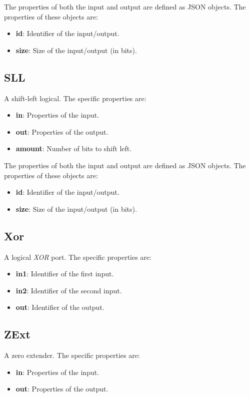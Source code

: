 \documentclass[11pt,a4paper,twoside,titlepage]{report}
\begin{document}
The properties of both the input and output are defined as JSON objects. 
The properties of these objects are:
\begin{itemize}
	\item \textbf{id}: Identifier of the input/output.
	\item \textbf{size}: Size of the input/output (in bits).
\end{itemize}

\subsection{SLL}

A shift-left logical. The specific properties are:
\begin{itemize}
	\item \textbf{in}: Properties of the input.
	\item \textbf{out}: Properties of the output.
	\item \textbf{amount}: Number of bits to shift left.
\end{itemize}

The properties of both the input and output are defined as JSON objects. 
The properties of these objects are:
\begin{itemize}
	\item \textbf{id}: Identifier of the input/output.
	\item \textbf{size}: Size of the input/output (in bits).
\end{itemize}

\subsection{Xor}

A logical \emph{XOR} port. The specific properties are:
\begin{itemize}
	\item \textbf{in1}: Identifier of the first input.
	\item \textbf{in2}: Identifier of the second input.
	\item \textbf{out}: Identifier of the output.
\end{itemize}

\subsection{ZExt}

A zero extender. The specific properties are:
\begin{itemize}
	\item \textbf{in}: Properties of the input.
	\item \textbf{out}: Properties of the output.
\end{itemize}
\end{document}
